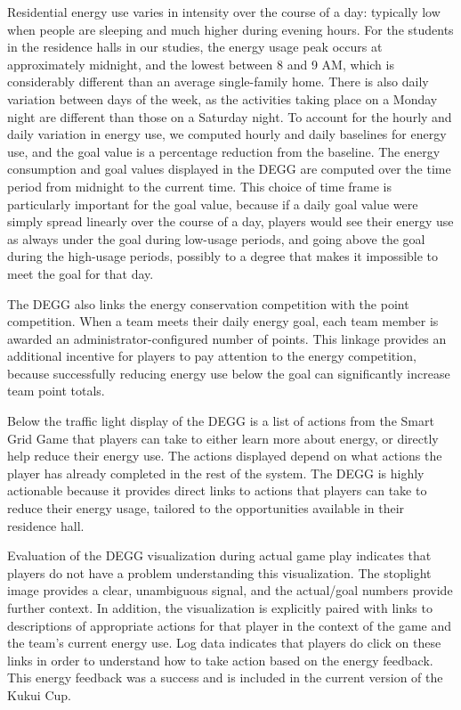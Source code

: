 \documentclass[10pt, conference, compsocconf]{IEEEtran}
\begin{document}
Residential energy use varies in intensity over the course of a day: typically low when people are sleeping and much higher during evening hours. For the students in the residence halls in our studies, the energy usage peak occurs at approximately midnight, and the lowest between 8 and 9 AM, which is considerably different than an average single-family home. There is also daily variation between days of the week, as the activities taking place on a Monday night are different than those on a Saturday night. To account for the hourly and daily variation in energy use, we computed hourly and daily baselines for energy use, and the goal value is a percentage reduction from the baseline. The energy consumption and goal values displayed in the DEGG are computed over the time period from midnight to the current time. This choice of time frame is particularly important for the goal value, because if a daily goal value were simply spread linearly over the course of a day, players would see their energy use as always under the goal during low-usage periods, and going above the goal during the high-usage periods, possibly to a degree that makes it impossible to meet the goal for that day.

The DEGG also links the energy conservation competition with the point competition. When a team meets their daily energy goal, each team member is awarded an administrator-configured number of points. This linkage provides an additional incentive for players to pay attention to the energy competition, because successfully reducing energy use below the goal can significantly increase team point totals.

Below the traffic light display of the DEGG is a list of actions from the Smart Grid Game that players can take to either learn more about energy, or directly help reduce their energy use. The actions displayed depend on what actions the player has already completed in the rest of the system. The DEGG is highly actionable because it provides direct links to actions that players can take to reduce their energy usage, tailored to the opportunities available in their residence hall.

Evaluation of the DEGG visualization during actual game play indicates that players do not have a problem understanding this visualization. The stoplight image provides a clear, unambiguous signal, and the actual/goal numbers provide further context. In addition, the visualization is explicitly paired with links to descriptions of appropriate actions for that player in the context of the game and the team's current energy use. Log data indicates that players do click on these links in order to understand how to take action based on the energy feedback. This energy feedback was a success and is included in the current version of the Kukui Cup.
\end{document}
